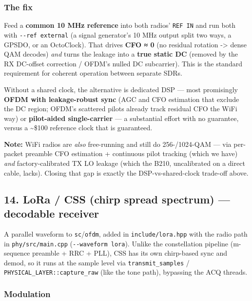 \documentclass[
  10pt,
]{article}
\begin{document}
\hypertarget{the-fix}{%
\subsubsection{The fix}\label{the-fix}}

Feed a \textbf{common 10 MHz reference} into both radios'
\texttt{REF\ IN} and run both with \texttt{-\/-ref\ external} (a signal
generator's 10 MHz output split two ways, a GPSDO, or an OctoClock).
That drives \textbf{CFO ≈ 0} (no residual rotation -\textgreater{} dense
QAM decodes) \emph{and} turns the leakage into a \textbf{true static DC}
(removed by the RX DC-offset correction / OFDM's nulled DC subcarrier).
This is the standard requirement for coherent operation between separate
SDRs.

Without a shared clock, the alternative is dedicated DSP --- most
promisingly \textbf{OFDM with leakage-robust sync} (AGC and CFO
estimation that exclude the DC region; OFDM's scattered pilots already
track residual CFO the WiFi way) or \textbf{pilot-aided single-carrier}
--- a substantial effort with no guarantee, versus a
\textasciitilde\$100 reference clock that is guaranteed.

\textbf{Note:} WiFi radios are \emph{also} free-running and still do
256-/1024-QAM --- via per-packet preamble CFO estimation + continuous
pilot tracking (which we have) \emph{and} factory-calibrated TX LO
leakage (which the B210, uncalibrated on a direct cable, lacks). Closing
that gap is exactly the DSP-vs-shared-clock trade-off above.

\hypertarget{14-lora--css-chirp-spread-spectrum--decodable-receiver}{%
\subsection{14. LoRa / CSS (chirp spread spectrum) --- decodable
receiver}\label{14-lora--css-chirp-spread-spectrum--decodable-receiver}}

A parallel waveform to \texttt{sc}/\texttt{ofdm}, added in
\texttt{include/lora.hpp} with the radio path in
\texttt{phy/src/main.cpp} (\texttt{-\/-waveform\ lora}). Unlike the
constellation pipeline (m-sequence preamble + RRC + PLL), CSS has its
own chirp-based sync and demod, so it runs at the sample level via
\texttt{transmit\_samples} / \texttt{PHYSICAL\_LAYER::capture\_raw}
(like the tone path), bypassing the ACQ threads.

\hypertarget{modulation}{%
\subsubsection{Modulation}\label{modulation}}
\end{document}
